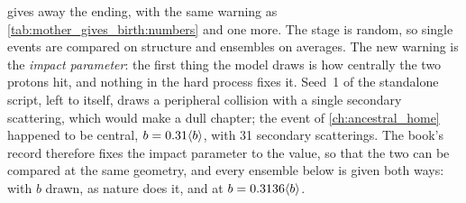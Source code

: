  gives away the ending, with the same
warning as \cref{tab:mother_gives_birth:numbers} and one more. The stage is
random, so single events are compared on structure and ensembles on
averages. The new warning is the \emph{impact parameter}: the first thing
the model draws is how centrally the two protons hit, and nothing in the
hard process fixes it. Seed~1 of the standalone script, left to itself,
draws a peripheral collision with a single secondary scattering, which would
make a dull chapter; the \CMSSW event of \cref{ch:ancestral_home} happened to
be central, $b=0.31\langle b\rangle$, with 31 secondary scatterings. The book's record
therefore fixes the impact parameter to the \CMSSW value, so that the two
can be compared at the same geometry, and every ensemble below is given both
ways: with $b$ drawn, as nature does it, and at $b=0.3136\langle b\rangle$.

